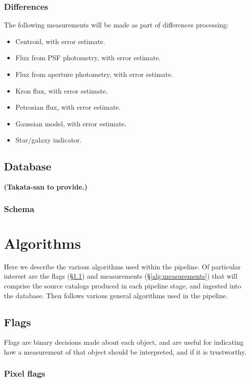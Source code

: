 \documentclass[12pt]{article}
\newcommand\tbd[1]{\textbf{\color{red}(#1)}}
\begin{document}
\subsubsection{Differences}

The following measurements will be made as part of differences processing:
\begin{itemize}
\item Centroid, with error estimate.
\item Flux from PSF photometry, with error estimate.
\item Flux from aperture photometry, with error estimate.
\item Kron flux, with error estimate.
\item Petrosian flux, with error estimate.
\item Gaussian model, with error estimate.
\item Star/galaxy indicator.
\end{itemize}


\subsection{Database}
\label{sec:database}
\tbd{Takata-san to provide.}
\subsubsection{Schema}

\section{Algorithms}
\label{sec:algorithms}

Here we describe the various algorithms used within the pipeline.  Of particular interest are the flags
(\S\ref{alg:flags}) and measurements (\S\ref{alg:measurements}) that will comprise the source catalogs
produced in each pipeline stage, and ingested into the database.  Then follows various general algorithms
used in the pipeline.

\subsection{Flags}
\label{alg:flags}

Flags are binary decisions made about each object, and are useful for indicating how a measurement of that
object should be interpreted, and if it is trustworthy.

\subsubsection{Pixel flags}
\end{document}
